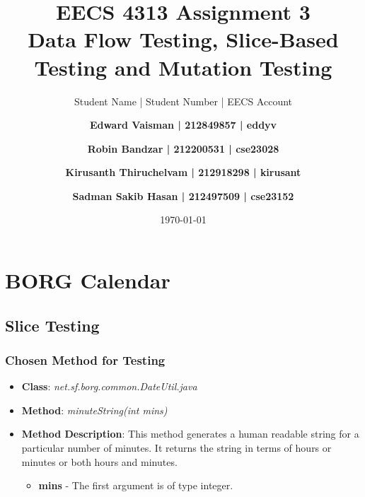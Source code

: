 \documentclass[fontsize=12pt,paper=letter,twoside]{scrartcl}
\author{Student Name | Student Number | EECS Account
\and \textbf{Edward Vaisman | 212849857 | eddyv}
\and \textbf{Robin Bandzar | 212200531 | cse23028}
\and \textbf{Kirusanth Thiruchelvam | 212918298 | kirusant}
\and \textbf{Sadman Sakib Hasan | 212497509 | cse23152}
}
\date{\today} %
\begin{document}
\title{EECS 4313 Assignment 3 \\Data Flow Testing, Slice-Based Testing and Mutation Testing}
\maketitle

\newpage

\tableofcontents


\newpage


\section{BORG Calendar}

\subsection{Slice Testing}

\subsubsection{Chosen Method for Testing}

\begin{itemize}
\item \textbf{Class}: \emph{net.sf.borg.common.DateUtil.java}
\item \textbf{Method}: \emph{minuteString(int mins)}
\item \textbf{Method Description}:
This method generates a human readable string for a particular number of minutes. It returns the string in terms of hours or minutes or both hours and minutes.
\begin{itemize}
\item \textbf{mins} - The first argument is of type integer.
\end{itemize}
\end{itemize}
\end{document}
